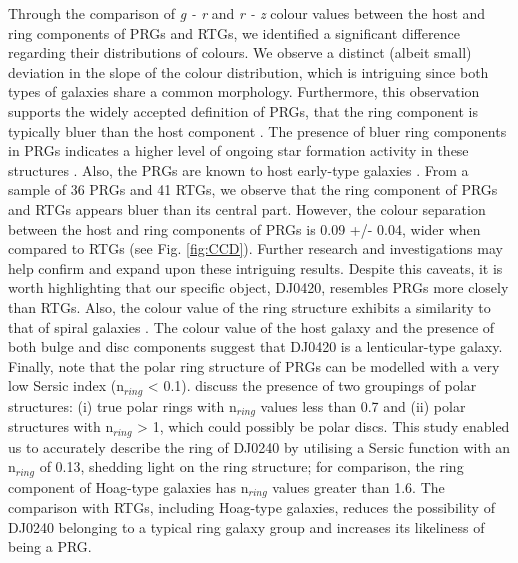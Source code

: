 \documentclass{aa}
\begin{document}
Through the comparison of {\it g - r} and {\it r - z} colour values between the host and ring components of PRGs and RTGs, we identified a significant difference regarding their distributions of colours. We observe a distinct (albeit small) deviation in the slope of the colour distribution, which is intriguing since both types of galaxies share a common morphology. Furthermore, this observation supports the widely accepted definition of PRGs, that the ring component is typically bluer than the host component \citep{2015Reshetnikov,2022Mosenkov}. The presence of bluer ring components in PRGs indicates a higher level of ongoing star formation activity in these structures \citep{2017smirnov}. Also,  the PRGs are known to host early-type galaxies \citep{2015Reshetnikov}. From a sample of 36 PRGs and 41 RTGs, we observe that the ring component of PRGs and RTGs appears bluer than its central part. However, the colour separation between the host and ring components of PRGs is 0.09 +/- 0.04, wider when compared to RTGs (see Fig. \ref{fig:CCD}). Further research and investigations may help confirm and expand upon these intriguing results.  Despite this caveats, it is worth highlighting that our specific object, DJ0420, resembles PRGs more closely than RTGs. Also, the colour value of the ring structure exhibits a similarity to that of spiral galaxies \citep{2007Fukugita}. The colour value of the host galaxy and the presence of both bulge and disc components suggest that DJ0420 is a lenticular-type galaxy. 
Finally, \citet{RM2019MNRAS.483.1470R} note that the polar ring structure of PRGs can be modelled with a very low Sersic index (n$_{ring}$ < 0.1).  \citet{2022Mosenkov} discuss the presence of two groupings of polar structures: (i) true polar rings with n$_{ring}$  values less than 0.7 and (ii) polar structures with n$_{ring}$ > 1, which could possibly be polar discs. This study enabled us to accurately describe the ring of DJ0240 by utilising a Sersic function with an n$_{ring}$ of 0.13, shedding light on the ring structure; for comparison, the ring component of Hoag-type galaxies has n$_{ring}$ values greater than 1.6. The comparison with RTGs, including Hoag-type galaxies, reduces the possibility of DJ0240 belonging to a typical ring galaxy group and increases its likeliness of being a PRG.
\end{document}

